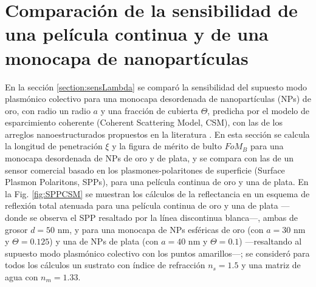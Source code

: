 \chapter{Comparación de la sensibilidad de una película continua y de una monocapa de nanopartículas}
\label{section:A1}

En la sección \ref{section:sensLambda} se comparó la sensibilidad del supuesto modo plasmónico colectivo para una monocapa desordenada de nanopartículas (NPs) de oro, con radio un radio $a$ y una fracción de cubierta $\Theta$, predicha por el modelo de esparcimiento coherente (Coherent Scattering Model, CSM), con las de los arreglos nanoestructurados propuestos en la literatura \cite{danilov2018ultra,svedendahl2009refractometric}. En esta sección se calcula  la longitud de penetración $\xi$ y la figura de mérito de bulto $\textit{FoM}_B$ para una monocapa desordenada de NPs  de oro y de plata, y se compara con las de un sensor comercial basado en los plasmones-polaritones de superficie (Surface Plasmon Polaritons, SPPs), para una película continua de oro y una de plata. En la Fig. \ref{fig:SPPCSM} se muestran los cálculos de la reflectancia en un esquema de reflexión total atenuada para una película continua de oro y una de plata ---donde se observa el SPP resaltado por la línea discontinua blanca---, ambas de grosor $d=50$ nm, y para una monocapa de NPs esféricas de oro (con $a=30$ nm y $\Theta=0.125$) y una de NPs de plata (con $a=40$ nm y $\Theta=0.1$) ---resaltando al supuesto modo  plasmónico colectivo con los puntos amarillos---; se consideró para todos los cálculos un sustrato con índice de refracción $n_s=1.5$ y una matriz de agua con $n_m=1.33$.

